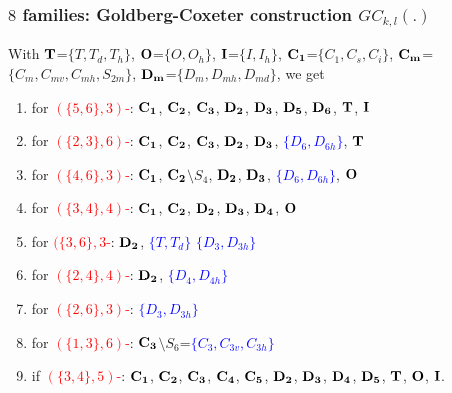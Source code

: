 \documentclass{beamer}
\begin{document}
\begin{frame}\frametitle{$8$ families: 
Goldberg-Coxeter construction  $GC_{k,l}(.)$}
\vspace{-3mm}
With
\textcolor{red}{${\bf T}$}=$\{T,T_d,T_h\}$, \textcolor{red}{${\bf O}$}=$\{O,O_h\}$,
\textcolor{red}{${\bf I}$}=$\{I,I_h\}$,
\textcolor{red}{${\bf C_1}$}=$\{C_1,C_s,C_i\}$,  
\textcolor{red}{${\bf C_m}$}=$\{C_m,C_{mv},C_{mh},S_{2m}\}$, 
 \textcolor{red}{${\bf D_m}$}=$\{D_m,D_{mh},D_{md}\}$,  
we get
\begin{enumerate}
\item[\ding{108}] for \textcolor{red}{$(\{5,6\},3)$-}:
${\bf C_1}$,  ${\bf C_2}$, ${\bf C_3}$,  ${\bf D_2}$,  ${\bf D_3}$, ${\bf 
D_5}$,  ${\bf D_6}$, ${\bf T}$,  \textcolor{blue}{${\bf I}$}
\item[\ding{108}]   for \textcolor{red}{$(\{2, 3\},6)$-}: ${\bf C_1}$,
${\bf C_2}$, ${\bf C_3}$, ${\bf D_2}$, ${\bf D_3}$,
\textcolor{blue}{$\{D_6,D_{6h}\}$}, \textcolor{blue}{${\bf T}$}
\item[\ding{108}]   for \textcolor{red}{$(\{4,6\},3)$-}: ${\bf C_1}$, 
${\bf C_2}$$\setminus$$ S_{4}$, ${\bf D_2}$, ${\bf 
D_3}$,  \textcolor{blue}{$\{D_6,D_{6h}\}$}, \textcolor{blue}{${\bf O}$}
\item[\ding{108}]  for \textcolor{red}{$(\{3, 4\},4)$-}: ${\bf C_{1}}$,
${\bf C_2}$,  ${\bf D_2}$,
${\bf D_3}$, ${\bf D_4}$, \textcolor{blue}{${\bf O}$}
\item[\ding{108}]  for \textcolor{red}{$(\{3,6\},3$-}: ${\bf D_{2}}$, 
\textcolor{blue}{$\{T,T_d\}$} 
\textcolor{blue}{$\{D_3,D_{3h}\}$}
\item[\ding{108}]  for \textcolor{red}{$(\{2, 4\},4)$-}: ${\bf D_2}$,  
\textcolor{blue}{$\{D_4,D_{4h}\}$}
\item[\ding{108}]  for \textcolor{red}{$(\{2, 6\},3)$-}: 
\textcolor{blue}{$\{D_3,D_{3h}\}$}
\item[\ding{108}] for \textcolor{red}{$(\{1, 3\},6)$-}:
${\bf C_3}$$\setminus$$ S_{6}$=\textcolor{blue}{$\{C_3,
C_{3v},C_{3h}\}$}
\item if  \textcolor{red}{$(\{3,4\},5)$-}:
${\bf C_1}$,  ${\bf C_2}$, ${\bf C_3}$,  ${\bf C_4}$, ${\bf C_5}$, ${\bf D_2}$,  
${\bf D_3}$, ${\bf
D_4}$,  ${\bf D_5}$, ${\bf T}$,  ${\bf O}$, ${\bf I}$.



\end{enumerate}
\end{frame}
\end{document}
